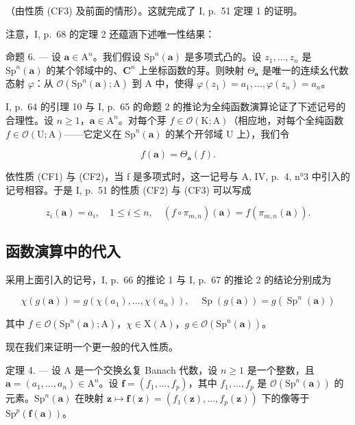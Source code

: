 （由性质 (CF3) 及前面的情形）。这就完成了 I, p.~51 定理 1 的证明。

注意，I, p.~68 的定理 2 还蕴涵下述唯一性结果：

命题 6. --- 设 \(\boldsymbol{a} \in \mathrm{A}^n\)。我们假设 \(\mathrm{Sp}^n(\boldsymbol{a})\) 是多项式凸的。设 \(z_1, \ldots, z_n\) 是 \(\mathrm{Sp}^n(\boldsymbol{a})\) 的某个邻域中的、\(\mathbf{C}^n\) 上坐标函数的芽。则映射 \(\Theta_{\boldsymbol{a}}\) 是唯一的连续幺代数态射 \(\varphi\)：从 \(\mathcal{O}(\mathrm{Sp}^n(\boldsymbol{a}); \mathrm{A})\) 到 A 中，使得 \(\varphi(z_1) = a_1, \ldots, \varphi(z_n) = a_n\)。

I, p.~64 的引理 10 与 I, p.~65 的命题 2 的推论为全纯函数演算论证了下述记号的合理性。设 \(n \geqslant 1\)，\(\boldsymbol{a} \in \mathrm{A}^n\)。对每个芽 \(f \in \mathcal{O}(\mathrm{K};\mathrm{A})\)（相应地，对每个全纯函数 \(f \in \mathcal{O}(\mathrm{U};\mathrm{A})\)——它定义在 \(\mathrm{Sp}^n (\boldsymbol{a})\) 的某个开邻域 U 上），我们令

\[
f (\boldsymbol {a}) = \Theta_ {\boldsymbol {a}} (f).\tag{6}
\]

依性质 (CF1) 与 (CF2)，当 f 是多项式时，这一记号与 A, IV, p.~4, n°3 中引入的记号相容。于是 I, p.~51 的性质 (CF2) 与 (CF3) 可以写成

\[
z _ {i} (\boldsymbol {a}) = a _ {i}, \quad 1 \leqslant i \leqslant n, \quad (f \circ \pi_ {m, n}) (\boldsymbol {a}) = f (\pi_ {m, n} (\boldsymbol {a})).
\]

\subsection{函数演算中的代入}

采用上面引入的记号，I, p.~66 的推论 1 与 I, p.~67 的推论 2 的结论分别成为

\[
\chi (g (\boldsymbol {a})) = g \left(\chi \left(a _ {1}\right), \dots , \chi \left(a _ {n}\right)\right), \quad \operatorname{Sp} (g (\boldsymbol {a})) = g \left(\operatorname{Sp} ^ {n} (\boldsymbol {a})\right)
\]

其中 \(f \in \mathcal{O}(\mathrm{Sp}^n(\boldsymbol{a});\mathrm{A})\)，\(\chi \in \mathrm{X}(\mathrm{A})\)，\(g \in \mathcal{O}(\mathrm{Sp}^n(\boldsymbol{a}))\)。

现在我们来证明一个更一般的代入性质。

定理 4. --- 设 A 是一个交换幺复 Banach 代数，设 \(n \geqslant 1\) 是一个整数，且 \(\boldsymbol{a} = (a_1, \ldots, a_n) \in \mathrm{A}^n\)。设 \(\boldsymbol{f} = (f_1, \ldots, f_p)\)，其中 \(f_1, \ldots, f_p\) 是 \(\mathcal{O}(\mathrm{Sp}^n(\boldsymbol{a}))\) 的元素。\(\mathrm{Sp}^n(\boldsymbol{a})\) 在映射 \(\boldsymbol{z} \mapsto \boldsymbol{f}(\boldsymbol{z}) = (f_1(\boldsymbol{z}), \ldots, f_p(\boldsymbol{z}))\) 下的像等于 \(\mathrm{Sp}^p(\boldsymbol{f}(\boldsymbol{a}))\)。

